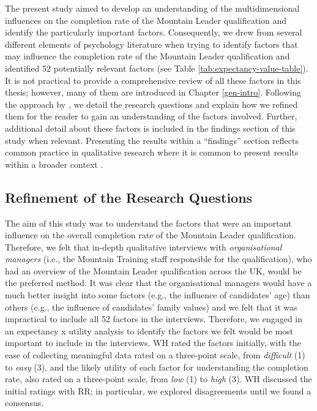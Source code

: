 \documentclass[
  12pt,
  a4paper,
]{book}
\begin{document}
The present study aimed to develop an understanding of the multidimensional influences on the completion rate of the Mountain Leader qualification and identify the particularly important factors. Consequently, we drew from several different elements of psychology literature when trying to identify factors that may influence the completion rate of the Mountain Leader qualification and identified 52 potentially relevant factors (see Table \ref{tab:expectancy-value-table}). It is not practical to provide a comprehensive review of all these factors in this thesis; however, many of them are introduced in Chapter \ref{gen-intro}. Following the approach by \citet{Hardy2017}, we detail the research questions and explain how we refined them for the reader to gain an understanding of the factors involved. Further, additional detail about these factors is included in the findings section of this study when relevant. Presenting the results within a ``findings'' section reflects common practice in qualitative research where it is common to present results within a broader context \citep{APA2020}.

\hypertarget{refinement-of-the-research-questions}{%
\subsection{Refinement of the Research Questions}\label{refinement-of-the-research-questions}}

The aim of this study was to understand the factors that were an important influence on the overall completion rate of the Mountain Leader qualification. Therefore, we felt that in-depth qualitative interviews with \emph{organisational managers} (i.e., the Mountain Training staff responsible for the qualification), who had an overview of the Mountain Leader qualification across the UK, would be the preferred method. It was clear that the organisational managers would have a much better insight into some factors (e.g., the influence of candidates' age) than others (e.g., the influence of candidates' family values) and we felt that it was impractical to include all 52 factors in the interviews. Therefore, we engaged in an expectancy x utility analysis to identify the factors we felt would be most important to include in the interviews. WH rated the factors initially, with the ease of collecting meaningful data rated on a three-point scale, from \emph{difficult} (1) to \emph{easy} (3), and the likely utility of each factor for understanding the completion rate, also rated on a three-point scale, from \emph{low} (1) to \emph{high} (3). WH discussed the initial ratings with RR; in particular, we explored disagreements until we found a consensus.
\end{document}
